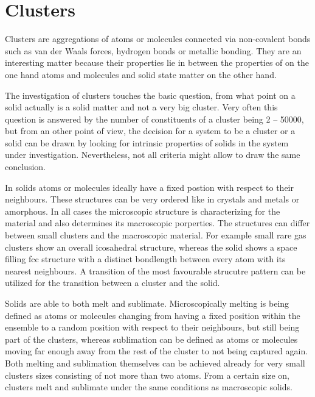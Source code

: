 \chapter{Clusters}

Clusters are aggregations of atoms or molecules connected via non-covalent
bonds such as van der Waals forces, hydrogen bonds or metallic bonding.
They are an interesting
matter because their properties lie in between the properties of on the one hand
atoms and molecules and solid state matter on the other hand.

The investigation of clusters touches the basic question, from what point
on a solid actually is a solid matter and not a very big cluster.
Very often this question is answered by the number of constituents
of a cluster being
2 -- 50000, but from an other point of view, the decision for
a system to be a cluster or a solid can be drawn by looking for
intrinsic 
properties of solids in the system under investigation.
Nevertheless, not all criteria might allow to draw the same conclusion.

In solids atoms or molecules ideally have a fixed postion with respect to their
neighbours. These structures can be very ordered like in crystals and metals
or amorphous. In all cases the microscopic structure is characterizing for
the material and also determines its macroscopic
porperties.
The structures can differ between small clusters and the macroscopic
material. For example small rare gas clusters show an overall icosahedral
structure, whereas the solid shows a space filling fcc structure with
a distinct bondlength between every atom with its nearest neighbours.
A transition of the most favourable strucutre pattern can be utilized
for the transition between a cluster and the solid.

Solids are able to both melt and sublimate. Microscopically melting
is being defined as atoms or
molecules changing from having a fixed position within the ensemble to a
random position with respect to their neighbours, but still being part
of the clusters, whereas sublimation can be defined as atoms or molecules
moving far enough away from the rest of the cluster to not being captured
again.
Both melting and sublimation themselves can be achieved already for very
small clusters
sizes consisting of not more than two atoms. From a certain size on,
clusters melt and sublimate under the same conditions as macroscopic
solids.

